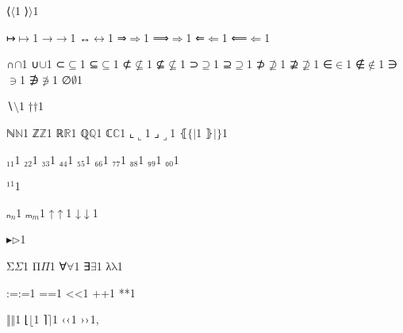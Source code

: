 {%
{⟨}{{\ensuremath{\langle}}}1
{⟩}{{\ensuremath{\rangle}}}1

{↦}{{\ensuremath{\mapsto}}}1
{→}{{\ensuremath{\rightarrow}}}1
{↔}{{\ensuremath{\leftrightarrow}}}1
{⇒}{{\ensuremath{\Rightarrow}}}1
{⟹}{{\ensuremath{\Longrightarrow}}}1
{⇐}{{\ensuremath{\Leftarrow}}}1
{⟸}{{\ensuremath{\Longleftarrow}}}1

{∩}{{\ensuremath{\cap}}}1
{∪}{{\ensuremath{\cup}}}1
{⊂}{{\ensuremath{\subseteq}}}1
{⊆}{{\ensuremath{\subseteq}}}1
{⊄}{{\ensuremath{\nsubseteq}}}1
{⊈}{{\ensuremath{\nsubseteq}}}1
{⊃}{{\ensuremath{\supseteq}}}1
{⊇}{{\ensuremath{\supseteq}}}1
{⊅}{{\ensuremath{\nsupseteq}}}1
{⊉}{{\ensuremath{\nsupseteq}}}1
{∈}{{\ensuremath{\in}}}1
{∉}{{\ensuremath{\notin}}}1
{∋}{{\ensuremath{\ni}}}1
{∌}{{\ensuremath{\notni}}}1
{∅}{{\ensuremath{\emptyset}}}1

{∖}{{\ensuremath{\setminus}}}1
{†}{{\ensuremath{\dag}}}1

{ℕ}{{\ensuremath{\mathbb{N}}}}1
{ℤ}{{\ensuremath{\mathbb{Z}}}}1
{ℝ}{{\ensuremath{\mathbb{R}}}}1
{ℚ}{{\ensuremath{\mathbb{Q}}}}1
{ℂ}{{\ensuremath{\mathbb{C}}}}1
{⌞}{{\ensuremath{\llcorner}}}1
{⌟}{{\ensuremath{\lrcorner}}}1
{⦃}{{\ensuremath{\{\!|}}}1
{⦄}{{\ensuremath{|\!\}}}}1

{₁}{{\ensuremath{_1}}}1
{₂}{{\ensuremath{_2}}}1
{₃}{{\ensuremath{_3}}}1
{₄}{{\ensuremath{_4}}}1
{₅}{{\ensuremath{_5}}}1
{₆}{{\ensuremath{_6}}}1
{₇}{{\ensuremath{_7}}}1
{₈}{{\ensuremath{_8}}}1
{₉}{{\ensuremath{_9}}}1
{₀}{{\ensuremath{_0}}}1

{¹}{{\ensuremath{^1}}}1

{ₙ}{{\ensuremath{_n}}}1
{ₘ}{{\ensuremath{_m}}}1
{↑}{{\ensuremath{\uparrow}}}1
{↓}{{\ensuremath{\downarrow}}}1

{▸}{{\ensuremath{\triangleright}}}1

{Σ}{{\color{symbolcolor}\ensuremath{\Sigma}}}1
{Π}{{\color{symbolcolor}\ensuremath{\Pi}}}1
{∀}{{\color{symbolcolor}\ensuremath{\forall}}}1
{∃}{{\color{symbolcolor}\ensuremath{\exists}}}1
{λ}{{\color{symbolcolor}\ensuremath{\mathrm{\lambda}}}}1

{:=}{{\color{symbolcolor}:=}}1
{=}{{\color{symbolcolor}=}}1
{<}{{\color{symbolcolor}<}}1
{+}{{\color{symbolcolor}+}}1
{*}{{\color{symbolcolor}*}}1

{‖}{{\ensuremath{\Vert}}}1
{⌊}{{\ensuremath{\lfloor}}}1
{⌉}{{\ensuremath{\rceil}}}1
{‹}{{\ensuremath{\text\guilsinglleft}}}1
{›}{{\ensuremath{\text\guilsinglright}}}1,

}
